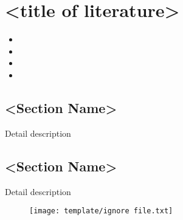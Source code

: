 \documentclass[../root]{subfiles}
\begin{document}
    \chapter{<title of literature>}

    \begin{shortsummary}
        \begin{itemize}
            \item {}
            \item {}
            \item {}
            \item {}
        \end{itemize}
    \end{shortsummary}

    \section{<Section Name>}

    Detail description
    
    \section{<Section Name>}

    Detail description

    \begin{figure}[]
        \centering
        \texttt{[image: template/ignore file.txt]}
        \caption{}
        \label{}
    \end{figure}

    \biblio
\end{document}
